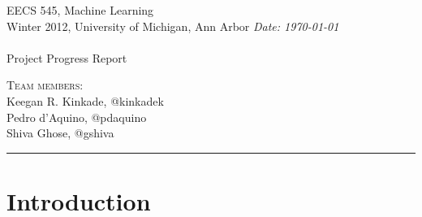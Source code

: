 \documentclass{article}
\newcommand{\shortbar}{\begin{center}\rule{5ex}{0.1pt}\end{center}}
\newcommand{\courseNumber}{EECS 545}
\newcommand{\courseTitle}{Machine Learning}
\newcommand{\semester}{Winter 2012}
\theoremstyle{plain}
\theoremstyle{definition}
\theoremstyle{remark}
\newenvironment{solution}[1]{\medskip\noindent{\bf Problem #1.~}}{\shortbar}
\newcommand{\solutions}[4]{
\vspace{-2ex}
\begin{center}
{\small  \courseNumber, \courseTitle
\hfill {\Large \bf {#1} }\\
\semester, University of Michigan, Ann Arbor \hfill
{\em Date: #3}}\\
\vspace{-1ex}
\hrulefill\\
\vspace{4ex}
{\normalsize Project Progress Report}\\
\vspace{2ex}
\end{center}
\begin{trivlist}
\item \textsc{Team members:} {#4}
\end{trivlist}
\noindent
\shortbar
\vspace{3ex}
}
\begin{document}
\solutions{}{}{\today}{\\ Keegan R. Kinkade, @kinkadek\\ Pedro d'Aquino, @pdaquino \\Shiva Ghose, @gshiva }
%
%

\begin{abstract}

In order for artificial intelligence agents to autonomously operate within a given environment, they must be capable of processing perceptual knowledge in such a manner as to intelligently interact with their environment. For a competitively driven AI agent, this becomes increasingly important, as the inability to intelligently process perceptual information will ultimately lead to defeat by those who are capable of such computation. To this end, the following describes the implementation of sophisticated machine learning techniques in an artificially driven tank battle simulator. Armed with such techniques, it is the goal of this project to provide a competitive, autonomous AI agent with the ability to determine how to best evade an opponent's attacks while striking in such a manner as to maximize the possibility of destroying the enemy. 

\end{abstract}

\section{Introduction}
\end{document}
